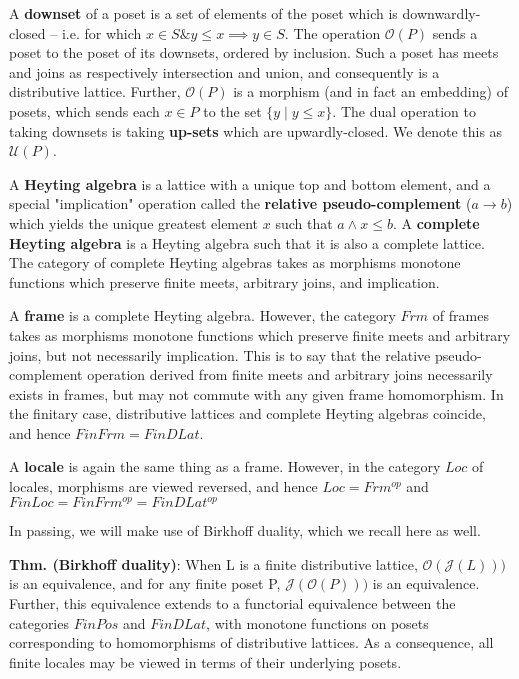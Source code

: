 \documentclass[hoptionsi,review,format=acmsmall]{acmart}
\theoremstyle{definition}
\newcommand{\Oc}{\mathcal{O}}
\newcommand{\Ucc}{\mathcal{U}}
\newcommand{\Jc}{\mathcal{J}}
\newcommand{\band}{\mathbin{\&}}
\begin{document}
A \textbf{downset} of a poset is a set of elements of the poset which is downwardly-closed -- i.e. for which \(x \in S \band y \le x \implies y \in S\). The operation \(\Oc(P)\) sends a poset to the poset of its downsets, ordered by inclusion. Such a poset has meets and joins as respectively intersection and union, and consequently is a distributive lattice. Further, \(\Oc(P)\) is a morphism (and in fact an embedding) of posets, which sends each \(x \in P\) to the set \(\{y \mathbin{|} y \le x\}\). The dual operation to taking downsets is taking \textbf{up-sets}  which are upwardly-closed. We denote this as \(\Ucc(P)\).

A \textbf{Heyting algebra} is a lattice with a unique top and bottom element, and a special "implication" operation called the \textbf{relative pseudo-complement} (\(a \rightarrow b\)) which yields the unique greatest element \(x\) such that \(a \wedge x \le b\). A \textbf{complete Heyting algebra} is a Heyting algebra such that it is also a complete lattice. The category of complete Heyting algebras takes as morphisms monotone functions which preserve finite meets, arbitrary joins, and implication.

A \textbf{frame} is a complete Heyting algebra. However, the category \(Frm\) of frames takes as morphisms monotone functions which preserve finite meets and arbitrary joins, but not necessarily implication. This is to say that the relative pseudo-complement operation derived from finite meets and arbitrary joins necessarily exists in frames, but may not commute with any given frame homomorphism. In the finitary case, distributive lattices and complete Heyting algebras coincide, and hence \(FinFrm = FinDLat\).

A \textbf{locale} is again the same thing as a frame. However, in the category \(Loc\) of locales, morphisms are viewed reversed, and hence \(Loc = Frm^{op}\) and \(FinLoc = FinFrm^{op} = FinDLat^{op}\)

In passing, we will make use of Birkhoff duality, which we recall here as well.

\textbf{Thm. (Birkhoff duality)}: When L is a finite distributive lattice, \(\Oc(\Jc(L)))\) is an equivalence, and for any finite poset P,  \(\Jc(\Oc(P)))\) is an equivalence. Further, this equivalence extends to a functorial equivalence between the categories \(FinPos\) and \(FinDLat\), with monotone functions on posets corresponding to homomorphisms of distributive lattices. As a consequence, all finite locales may be viewed in terms of their underlying posets.
\end{document}

